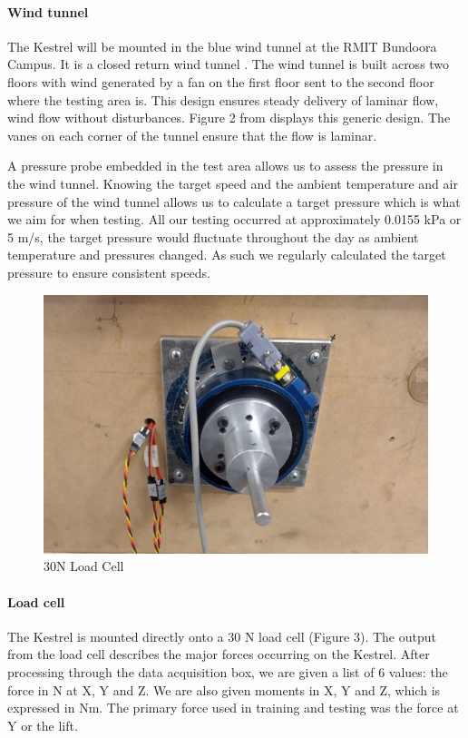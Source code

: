     \paragraph{Wind tunnel}
    The Kestrel will be mounted in the blue wind tunnel at the RMIT
    Bundoora Campus. It is a closed return wind tunnel \cite{11}. The
    wind tunnel is built across two floors with wind generated by a fan on
    the first floor sent to the second floor where the testing area is.
    This design ensures steady delivery of laminar flow, wind flow without
    disturbances. Figure 2 from displays this generic design. The vanes on
    each corner of the tunnel ensure that the flow is laminar. 

    A pressure probe embedded in the test area allows us to assess the
    pressure in the wind tunnel. Knowing the target speed and the ambient
    temperature and air pressure of the wind tunnel allows us to calculate
    a target pressure which is what we aim for when testing. All our testing
    occurred at approximately 0.0155 kPa or 5 m/s, the target pressure would
    fluctuate throughout the day as ambient temperature and pressures
    changed. As such we regularly calculated the target pressure to ensure
    consistent speeds.

    \begin{figure}
        \includegraphics[width=\textwidth/2]{./img/Fig3_load_cell.jpg}
        \caption{\label{fig:figure 3} 30N Load Cell}
    \end{figure}

   \paragraph{Load cell} The Kestrel is mounted directly onto a 30 N load cell (Figure 3). The
   output from the load cell describes the major forces occurring on the
   Kestrel. After processing through the data acquisition box, we are given
   a list of 6 values: the force in N at X, Y and Z. We are also given
   moments in X, Y and Z, which is expressed in Nm. The primary force used
    in training and testing was the force at Y or the lift.

